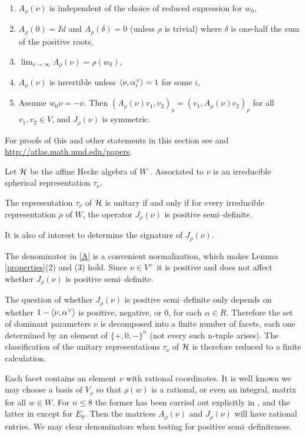 \begin{lemma}
\label{properties}
\begin{enumerate}
\item $A_\rho(\nu)$ is independent of the choice of reduced
expression for $w_0$,
\item $A_\rho(0)=Id$ and $A_\rho(\delta)=0$ (unless $\rho$ is
  trivial) where $\delta$ is one-half
  the sum of the positive roots,
\item $\lim_{\nu\rightarrow\infty}A_\rho(\nu)=\rho(w_0)$,
\item $A_\rho(\nu)$ is invertible unless $\langle\nu,\alpha^\vee_i\rangle=1$ for
some $i$,
\item Assume $w_0\nu=-\nu$. Then $(A_\rho(\nu)v_1,v_2)_\rho=(v_1,A_\rho(\nu)v_2)_\rho$ for all
$v_1,v_2\in V$, and $J_\rho(\nu)$ is symmetric.
\end{enumerate}
\end{lemma}

For proofs of this and other statements in this section see
\cite{barbasch_spherical} and 
\url{http://atlas.math.umd.edu/papers}.

Let ${\mathcal H}$ be the affine Hecke algebra of $W$ \cite[Chapter 7]{humphreys_coxeter}.
Associated to $\nu$ is an irreducible spherical representation $\tau_{\nu}$.


\begin{lemma}
\label{tau}
The representation $\tau_\nu$ of ${\mathcal H}$ is unitary if and only if 
for every irreducible representation $\rho$ of $W$, the operator
$J_\rho(\nu)$ is positive semi--definite.
\end{lemma}

It is also of interest to determine the signature of $J_\rho(\nu)$.

The denominator in \eqref{A} is a convenient normalization, which
makes Lemma \ref{properties}(2) and (3) hold. 
Since
$\nu\in V^+$ it is positive and does not affect whether
$J_\rho(\nu)$ is positive semi--definite.

The question of whether $J_\rho(\nu)$ is positive
semi--definite only depends on whether $1-\langle\nu,\alpha^\vee\rangle$ is
positive, negative, or $0$, for each $\alpha\in R$. Therefore the set
of dominant parameters $\nu$ is decomposed into a finite number of
facets, each one determined by an element of $\{+,0,-\}^n$ (not every
such n-tuple arises). 
The classification of the unitary representations $\tau_\nu$ of 
${\mathcal H}$ is therefore reduced to a finite calculation.

Each facet contains an element $\nu$ with rational coordinates. It is
well known we may choose a basis of $V_\rho$ so that $\rho(w)$ is
a rational, or even an integral, matrix for all $w\in W$. For $n\le 8$
the former has been carried out explicitly in \cite{stembridge_models}, and
the latter in \cite{adams_models} except for $E_8$. Then the matrices
$A_\rho(\nu)$ and $J_\rho(\nu)$ will have rational
entries.  We may clear denominators when testing for positive
semi--definiteness. 

